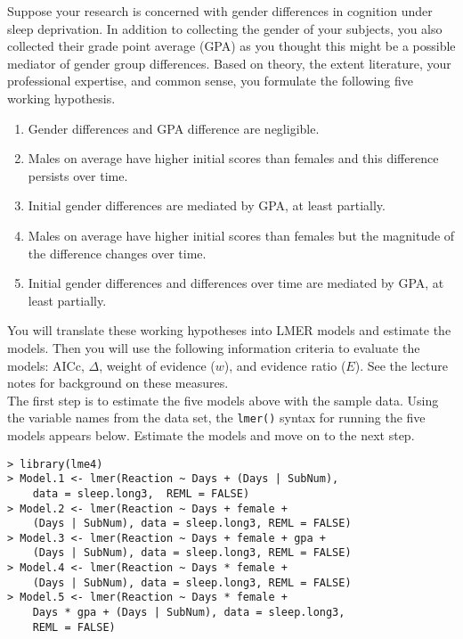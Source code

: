\documentclass[]{article}
\begin{document}
\noindent Suppose your research is concerned with gender differences in cognition under sleep deprivation. In addition to collecting the gender of your subjects, you also collected their grade point average (GPA) as you thought this might be a possible mediator of gender group differences. Based on theory, the extent literature, your professional expertise, and common sense, you formulate the following five
working hypothesis.

\begin{enumerate}
\item Gender differences and GPA difference are negligible.
\item Males on average have higher initial scores than females and this difference persists over time.
\item Initial gender differences are mediated by GPA, at least partially.
\item Males on average have higher initial scores than females but the magnitude of the difference changes over time.
\item Initial gender differences and differences over time are mediated by GPA, at least partially.
\end{enumerate}

You will translate these working hypotheses into LMER models and estimate the models. Then you will use the following information criteria to evaluate the models: AICc, $\Delta$, weight of evidence
($w$), and evidence ratio ($E$). See the lecture notes for background on these measures.\\
\linebreak
The first step is to estimate the five models above with the sample data. Using the variable names
from the data set, the \texttt{lmer()} syntax for running the five models appears below. Estimate
the models and move on to the next step.

\begin{shaded}
\begin{lstlisting}
> library(lme4)
> Model.1 <- lmer(Reaction ~ Days + (Days | SubNum), 
    data = sleep.long3,  REML = FALSE)
> Model.2 <- lmer(Reaction ~ Days + female + 
    (Days | SubNum), data = sleep.long3, REML = FALSE)
> Model.3 <- lmer(Reaction ~ Days + female + gpa + 
    (Days | SubNum), data = sleep.long3, REML = FALSE)          
> Model.4 <- lmer(Reaction ~ Days * female + 
    (Days | SubNum), data = sleep.long3, REML = FALSE)
> Model.5 <- lmer(Reaction ~ Days * female + 
    Days * gpa + (Days | SubNum), data = sleep.long3,
    REML = FALSE)
\end{lstlisting}
\end{shaded}
 
\end{document}
